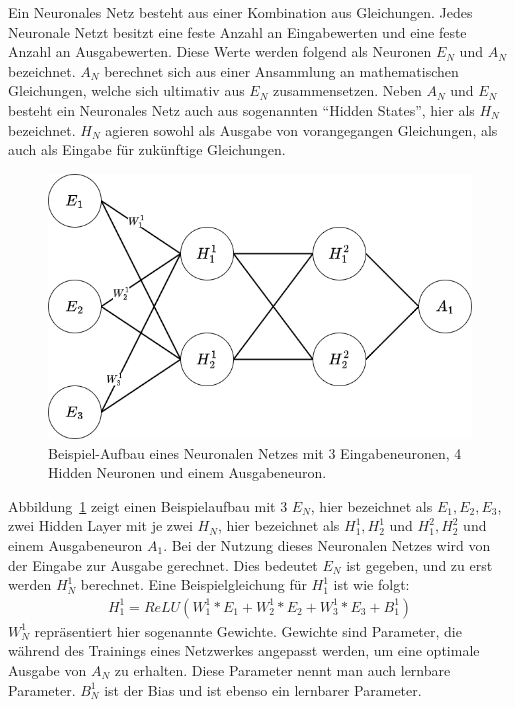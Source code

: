 Ein Neuronales Netz besteht aus einer Kombination aus Gleichungen.
Jedes Neuronale Netzt besitzt eine feste Anzahl an Eingabewerten und eine feste Anzahl an Ausgabewerten.
Diese Werte werden folgend als Neuronen $E_N$ und $A_N$ bezeichnet.
$A_N$ berechnet sich aus einer Ansammlung an mathematischen Gleichungen, welche sich ultimativ aus  $E_N$ zusammensetzen.
Neben $A_N$ und $E_N$ besteht ein Neuronales Netz auch aus sogenannten \enquote{Hidden States}, hier als $H_N$ bezeichnet.
$H_N$ agieren sowohl als Ausgabe von vorangegangen Gleichungen, als auch als Eingabe für zukünftige Gleichungen.\\
\begin{figure}
    \centering
    \includegraphics[width=\textwidth]{zeichnungen/nn.png}
    \caption{Beispiel-Aufbau eines Neuronalen Netzes mit 3 Eingabeneuronen, 4 Hidden Neuronen und einem Ausgabeneuron.}\label{nn_simple}
\end{figure}
Abbildung~\ref{nn_simple} zeigt einen Beispielaufbau mit 3 $E_N$, hier bezeichnet als $E_1,E_2,E_3$, zwei Hidden Layer mit je zwei $H_N$, hier bezeichnet als $H^1_1, H^1_2$ und $H^2_1, H^2_2$ und einem Ausgabeneuron $A_1$.
Bei der Nutzung dieses Neuronalen Netzes wird von der Eingabe zur Ausgabe gerechnet.
Dies bedeutet $E_N$ ist gegeben, und zu erst werden $H^1_N$ berechnet.
Eine Beispielgleichung für $H^1_1$ ist wie folgt:
\begin{align}
    H^1_1=ReLU(W^1_1*E_1 + W^1_2*E_2 + W^1_3*E_3 + B^1_1)
\end{align}
$W^1_N$ repräsentiert hier sogenannte Gewichte.
Gewichte sind Parameter, die während des Trainings eines Netzwerkes angepasst werden, um eine optimale Ausgabe von $A_N$ zu erhalten.
Diese Parameter nennt man auch lernbare Parameter.
$B^1_N$ ist der Bias und ist ebenso ein lernbarer Parameter.
